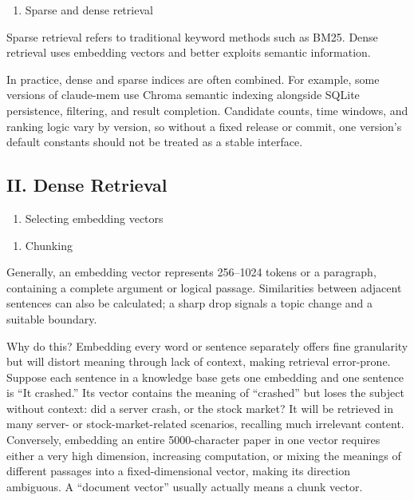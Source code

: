 \begin{enumerate}
\def\labelenumi{(\Roman{enumi})}
\setcounter{enumi}{3}
\tightlist
\item
  Sparse and dense retrieval
\end{enumerate}

Sparse retrieval refers to traditional keyword methods such as BM25. Dense retrieval uses embedding vectors and better exploits semantic information.

In practice, dense and sparse indices are often combined. For example, some versions of claude-mem use Chroma semantic indexing alongside SQLite persistence, filtering, and result completion. Candidate counts, time windows, and ranking logic vary by version, so without a fixed release or commit, one version's default constants should not be treated as a stable interface.

\hypertarget{ii.-dense-retrieval}{%
\subsection{II. Dense Retrieval}\label{ii.-dense-retrieval}}

\begin{enumerate}
\def\labelenumi{(\Roman{enumi})}
\tightlist
\item
  Selecting embedding vectors
\end{enumerate}

\begin{enumerate}
\def\labelenumi{\arabic{enumi}.}
\tightlist
\item
  Chunking
\end{enumerate}

Generally, an embedding vector represents 256--1024 tokens or a paragraph, containing a complete argument or logical passage. Similarities between adjacent sentences can also be calculated; a sharp drop signals a topic change and a suitable boundary.

Why do this? Embedding every word or sentence separately offers fine granularity but will distort meaning through lack of context, making retrieval error-prone. Suppose each sentence in a knowledge base gets one embedding and one sentence is ``It crashed.'' Its vector contains the meaning of ``crashed'' but loses the subject without context: did a server crash, or the stock market? It will be retrieved in many server- or stock-market-related scenarios, recalling much irrelevant content. Conversely, embedding an entire 5000-character paper in one vector requires either a very high dimension, increasing computation, or mixing the meanings of different passages into a fixed-dimensional vector, making its direction ambiguous. A ``document vector'' usually actually means a chunk vector.

